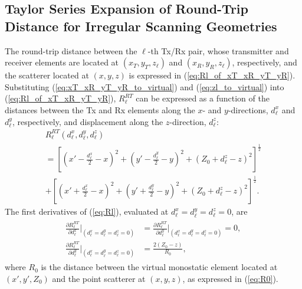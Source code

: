 \documentclass{ieeeaccess}
\begin{document}
\subsection{Taylor Series Expansion of Round-Trip Distance for Irregular Scanning Geometries}
\label{app:proof}
The round-trip distance between the $\ell$-th Tx/Rx pair, whose transmitter and receiver elements are located at $(x_T,y_T,z_\ell)$ and $(x_R,y_R,z_\ell)$, respectively, and the scatterer located at $(x,y,z)$ is expressed in (\ref{eq:Rl_of_xT_xR_yT_yR}). 
Substituting (\ref{eq:xT_xR_yT_yR_to_virtual}) and (\ref{eq:zl_to_virtual}) into (\ref{eq:Rl_of_xT_xR_yT_yR}), $R_\ell^{RT}$ can be expressed as a function of the distances between the Tx and Rx elements along the $x$- and $y$-directions, $d_\ell^x$ and $d_\ell^y$, respectively, and displacement along the $z$-direction, $d_\ell^z$:
\begin{multline}
\label{eq:Rl}
    R_\ell^{RT}(d_\ell^x,d_\ell^y,d_\ell^z) \\
    = \left[(x' - \frac{d_\ell^x}{2} - x)^2 + (y' - \frac{d_\ell^y}{2} - y)^2 + (Z_0 + d_\ell^z - z)^2 \right]^{\frac{1}{2}} \\
    + \left[(x' + \frac{d_\ell^x}{2} - x)^2 + (y' + \frac{d_\ell^y}{2} - y)^2 + (Z_0 + d_\ell^z - z)^2 \right]^{\frac{1}{2}}.
\end{multline}
The first derivatives of (\ref{eq:Rl}), evaluated at $d_\ell^x = d_\ell^y = d_\ell^z = 0$, are
\begin{align}
\begin{split}
\label{eq:first_derivatives}
    \frac{\partial R_\ell^{RT}}{\partial d_\ell^x} \biggr\rvert_{(d_\ell^x = d_\ell^y = d_\ell^z = 0)} &= \frac{\partial R_\ell^{RT}}{\partial d_\ell^y} \biggr\rvert_{(d_\ell^x = d_\ell^y = d_\ell^z = 0)} = 0, \\
    \frac{\partial R_\ell^{RT}}{\partial d_\ell^y} \biggr\rvert_{(d_\ell^x = d_\ell^y = d_\ell^z = 0)} &= \frac{2(Z_0 - z)}{R_0},
\end{split}
\end{align}
where $R_0$ is the distance between the virtual monostatic element located at $(x',y',Z_0)$ and the point scatterer at $(x,y,z)$, as expressed in (\ref{eq:R0}).
\end{document}
